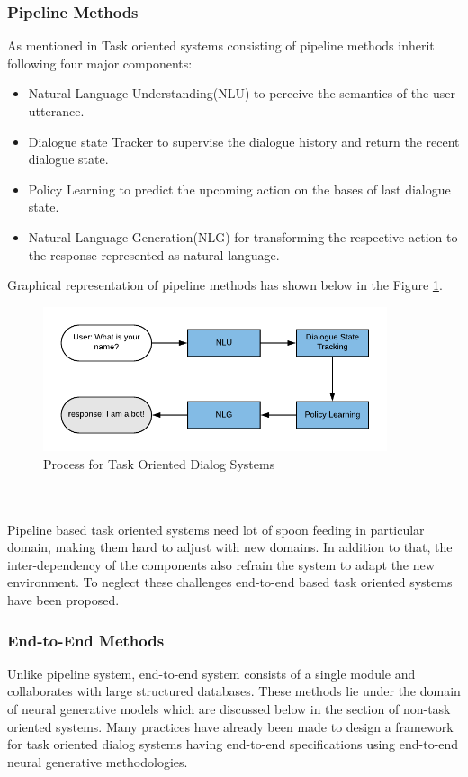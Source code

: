 \subsubsection*{Pipeline Methods \label{sec:pipelineMethods}}
As mentioned in \cite{surveyondialogsystems} Task oriented systems consisting of pipeline methods inherit following four major components:
\begin{itemize}
\item Natural Language Understanding(NLU) to perceive the semantics of the user utterance.
\item Dialogue state Tracker to supervise the dialogue history and return the recent dialogue state.
\item Policy Learning to predict the upcoming action on the bases of last dialogue state.
\item Natural Language Generation(NLG) for transforming the respective action to the response represented as natural language.
\end{itemize}
Graphical representation of pipeline methods has shown below in the Figure \ref{fig:to}. 
\begin{figure}[h]
    \centering
    \includegraphics[width=0.9\textwidth]{img/Task_oriented.pdf}
    \caption{Process for Task Oriented Dialog Systems \cite{surveyondialogsystems}}
    \label{fig:to}
\end{figure}
\\~\\
Pipeline based task oriented systems need lot of spoon feeding in particular domain, making them hard to adjust with new domains. In addition to that, the inter-dependency of the components also refrain the system to adapt the new environment. To neglect these challenges end-to-end based task oriented systems have been proposed. \cite{surveyondialogsystems}

\subsubsection*{End-to-End Methods}
Unlike pipeline system, end-to-end system consists of a single module and collaborates with large structured databases. These methods lie under the domain of neural generative models which are discussed below in the section of non-task oriented systems. Many practices have already been made to design a framework for task oriented dialog systems having end-to-end specifications using end-to-end neural generative methodologies. \cite{surveyondialogsystems}

